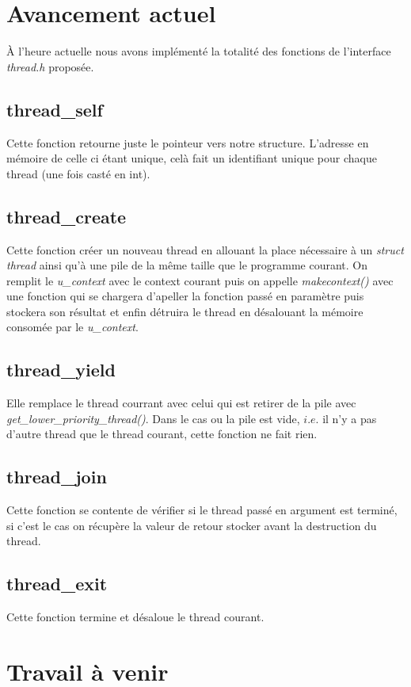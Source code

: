 \section{Avancement actuel}
À l'heure actuelle nous avons implémenté la totalité des fonctions de l'interface \textit{thread.h} proposée. 

\subsection{thread\_self}
Cette fonction retourne juste le pointeur vers notre structure.
L'adresse en mémoire de celle ci étant unique, celà fait un identifiant unique pour chaque thread (une fois casté en int).

\subsection{thread\_create}
Cette fonction créer un nouveau thread en allouant la place nécessaire à un \textit{struct thread} ainsi qu'à une pile de la même taille que le programme courant. On remplit le \textit{u\_context} avec le context courant puis on appelle \textit{makecontext()} avec une fonction qui se chargera d'apeller la fonction passé en paramètre puis stockera son résultat et enfin détruira le thread en désalouant la mémoire consomée par le \textit{u\_context}.

\subsection{thread\_yield}
Elle remplace le thread courrant avec celui qui est retirer de la pile avec \textit{get\_lower\_priority\_thread()}. Dans le cas ou la pile est vide, $i.e.$ il n'y a pas d'autre thread que le thread courant, cette fonction ne fait rien.

\subsection{thread\_join}
Cette fonction se contente de vérifier si le thread passé en argument est terminé, si c'est le cas on récupère la valeur de retour stocker avant la destruction du thread. 


\subsection{thread\_exit}
Cette fonction termine et désaloue le thread courant.

\section{Travail à venir}

